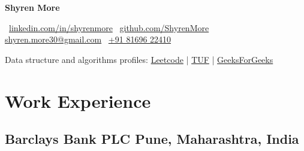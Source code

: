 \documentclass[a4,10pt]{article}
\begin{document}



\begin{flushleft}
    {\Huge \bfseries Shyren More} \\
    
    \vspace{2pt}
    
    \faLinkedin\, \href{https://linkedin.com/in/shyrenmore/}{linkedin.com/in/shyrenmore} \hspace{1em}
    \faGithub\, \href{https://github.com/ShyrenMore}{github.com/ShyrenMore} \hspace{1em}
    \faEnvelope\, \href{mailto:shyren.more30@gmail.com}{shyren.more30@gmail.com} \hspace{1em}
    \faPhone\, \href{tel:+918169622410}{+91 81696 22410}

    \vspace{4pt}

    Data structure and algorithms profiles:
    \href{https://leetcode.com/shyren_more/}{Leetcode} | 
    \href{https://takeuforward.org/plus/profile/shyren_more}{TUF} | 
    \href{https://www.geeksforgeeks.org/user/shyrenmore30/}{GeeksForGeeks}
\end{flushleft}



\vspace{-18pt}
\section{Work Experience}

\subsection*{Barclays Bank PLC \hfill {\normalsize\normalfont Pune, Maharashtra, India}}
\end{document}
